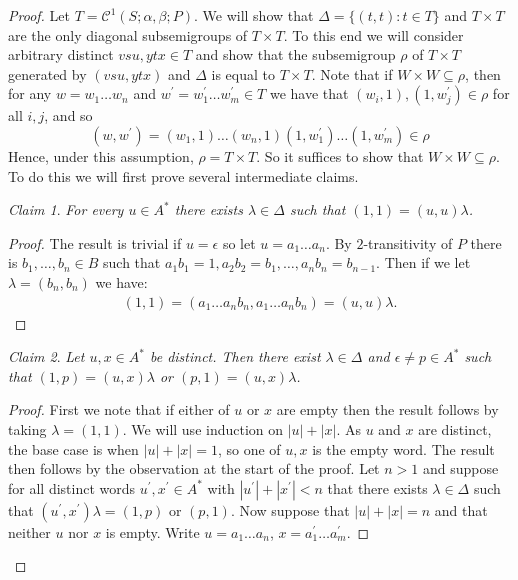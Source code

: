 \documentclass[a4paper, 12pt,reqno]{amsart}
\theoremstyle{plain}
\theoremstyle{definition}
\theoremstyle{remark}
\newtheorem{cclaim}{Claim}[thm]
\newenvironment{claim}{\begin{cclaim}\it}{\end{cclaim}}
\newcommand{\CS}{\mathcal{C}^1(S;\alpha,\beta;P)}
\begin{document}
\begin{proof}
    Let $T = \CS$. We will show that $\Delta=\{ (t,t)\colon t\in T\}$ and $T \times T$ are the only diagonal subsemigroups of $T \times T$.
    To this end we will consider arbitrary distinct $vsu, ytx \in T$ and show that the subsemigroup $\rho$ of $T\times T$ generated by $(vsu,ytx)$ and $\Delta$ is equal to $T \times T$.
    Note that if $W \times W \subseteq \rho $, then for any $w = w_1 \dots w_n $ and $ w^\prime = w^\prime_1 \dots w^\prime_m \in T$ we have that $(w_i,1),(1,w_j^\prime) \in \rho$ for all $i,j$, and so
    \begin{equation*}
        (w,w^\prime) = (w_1 , 1)\dots (w_n,1)(1,w_1^\prime)\dots (1,w_m^\prime)  \in \rho
    \end{equation*}
    Hence, under this assumption, $\rho = T \times T$.
    So it suffices to show that $W \times W \subseteq \rho$.
    To do this we will first prove several intermediate claims.

    \begin{claim}
        \label{1}
        For every $u\in A^\ast$  
       there exists $\lambda \in \Delta$ such that $(1,1) = (u,u)\lambda$.
    \end{claim}

    \begin{proof}
        The result is trivial if $u = \epsilon$ so let $u = a_1 \dots a_n$.
        By $2$-transitivity of $P$ there is $b_1 , \dots , b_n \in B$ such that $a_1 b_1 = 1 , a_2 b_2 = b_1 , \dots , a_n b_n = b_{n-1}$. Then if we let $\lambda = (b_n,b_n)$ we have:
        \begin{align*}
            (1,1) = (a_1 \dots a_n b_n ,a_1 \dots a_n b_n) = (u,u) \lambda .
        \end{align*}
    \end{proof}

    \begin{claim}
        \label{2}
        Let $u, x\in A^\ast$ be distinct. 
        Then there exist $\lambda \in \Delta$ and $\epsilon\neq p \in A^*$ such that $(1,p) = (u,x) \lambda$ or $(p,1) = (u,x) \lambda$.
    \end{claim}

    \begin{proof}
        First we note that if either of $u$ or $x$ are empty then the result follows by taking $\lambda = (1,1)$.
        We will use induction on $|u|+|x|$.
        As $u$ and $x$ are distinct, the base case is when $|u|+|x| = 1$, so one of $u,x$ is the empty word. 
        The result then follows by the observation at the start of the proof.
        Let $n > 1$ and suppose for all distinct words $u^\prime,x^\prime \in A^\ast$ with $|u^\prime| + |x^\prime| < n$ that there exists $\lambda \in \Delta$ such that $(u^\prime,x^\prime) \lambda = (1,p)$ or $(p,1)$.
        Now suppose that $|u| +|x| = n$ and that neither $u$ nor $x$ is empty.
        Write $u = a_1 \dots a_n$,  $x = a_1^\prime \dots a_m^\prime$.
        

\end{proof}
\end{proof}
\end{document}
